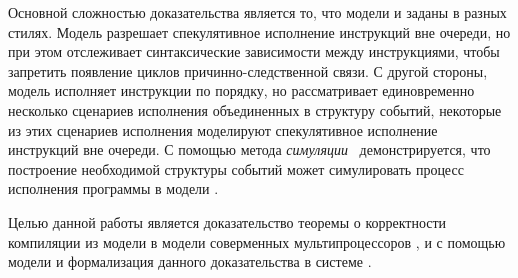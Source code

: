 Основной сложностью доказательства является то, что модели \Wkm и \IMM
заданы в разных стилях. Модель \IMM разрешает спекулятивное 
исполнение инструкций вне очереди, но при этом 
отслеживает синтаксические зависимости между инструкциями, 
чтобы запретить появление циклов причинно-следственной связи. 
С другой стороны, модель \Wkm исполняет инструкции по порядку, 
но рассматривает единовременно несколько сценариев исполнения
объединенных в структуру событий,
некоторые из этих сценариев исполнения моделируют 
спекулятивное исполнение инструкций вне очереди. 
С помощью метода \emph{симуляции}~\cite{Milner:1971} 
демонстрируется, что построение необходимой структуры событий может 
симулировать процесс исполнения программы в модели \IMM.

\pagebreak


Целью данной работы является доказательство 
теоремы о корректности компиляции из модели \Wkm 
в модели соверменных мультипроцессоров \Intel, \ARM и \POWER
с помощью модели \IMM и формализация данного доказательства в системе \coq. 
